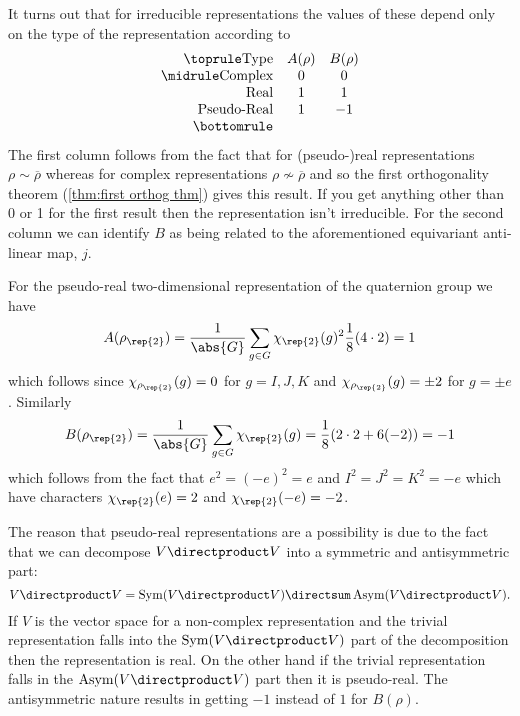 It turns out that for irreducible representations the values of these depend
only on the type of the representation according to
\begin{equation}
    \begin{array}{rcc}\toprule
        \text{Type} & A(\rho) & B(\rho)\\ \midrule
        \text{Complex} & 0 & 0\\
        \text{Real} & 1 & 1\\
        \text{Pseudo-Real} & 1 & -1 \\ \bottomrule
    \end{array}
\end{equation}
The first column follows from the fact that for (pseudo-)real
representations \(\rho \sim \overline{\rho}\) whereas for complex
representations \(\rho \not\sim \overline{\rho}\) and so the first orthogonality
theorem (\cref{thm:first orthog thm}) gives this result.
If you get anything other than 0 or 1 for the first result then the
representation isn't irreducible.
For the second column we can identify \(B\) as being related to the
aforementioned equivariant anti-linear map, \(j\).

\begin{exm}{}{}
    For the pseudo-real two-dimensional representation of the quaternion
    group we have
    \begin{equation}
        A(\rho_{\rep{2}}) = \frac{1}{\abs{G}} \sum_{g\in G}
        \chi_{\rep{2}}(g)^2 \frac{1}{8}(4 \cdot 2) = 1
    \end{equation}
    which follows since \(\chi_{\rho_{\rep{2}}}(g) = 0\) for \(g = I, J, K\)
    and \(\chi_{\rho_{\rep{2}}}(g) = \pm 2\) for \(g = \pm e\).
    Similarly
    \begin{equation}
        B(\rho_{\rep{2}}) = \frac{1}{\abs{G}} \sum_{g \in G}
        \chi_{\rep{2}}(g) = \frac{1}{8} (2 \cdot 2 + 6 (-2)) = -1
    \end{equation}
    which follows from the fact that \(e^2 = (-e)^2 = e\) and \(I^2 = J^2 =
    K^2 = -e\) which have characters \(\chi_{\rep{2}}(e) = 2\) and
    \(\chi_{\rep{2}}(-e) = -2\).
\end{exm}

The reason that pseudo-real representations are a possibility is due to the
fact that we can decompose \(V \directproduct V\) into a symmetric and
antisymmetric part:
\begin{equation}
    V \directproduct V = \mathop{\mathrm{Sym}}(V \directproduct V)
    \directsum \mathop{\mathrm{Asym}}(V \directproduct V).
\end{equation}
If \(V\) is the vector space for a non-complex representation and the
trivial representation falls into the \(\mathop{\mathrm{Sym}}(V \directproduct
V)\) part of the decomposition then the representation is real.
On the other hand if the trivial representation falls in the
\(\mathop{\mathrm{Asym}}(V \directproduct V)\) part then it is pseudo-real.
The antisymmetric nature results in getting \(-1\) instead of \(1\) for
\(B(\rho)\).

